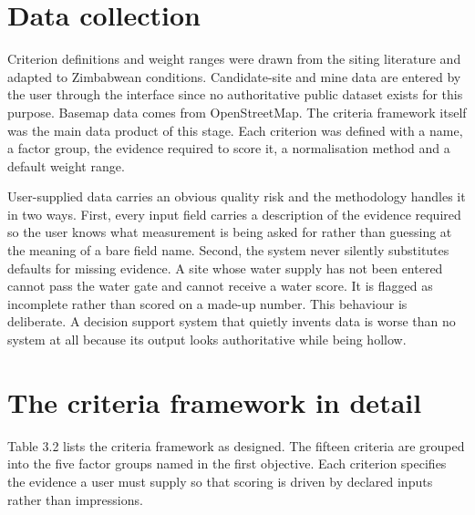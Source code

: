\documentclass[12pt,a4paper]{report}
\begin{document}
\section{Data collection}
Criterion definitions and weight ranges were drawn from the siting
literature and adapted to Zimbabwean conditions. Candidate-site and
mine data are entered by the user through the interface since no
authoritative public dataset exists for this purpose. Basemap data
comes from OpenStreetMap. The criteria framework itself was the main
data product of this stage. Each criterion was defined with a name, a
factor group, the evidence required to score it, a normalisation
method and a default weight range.

User-supplied data carries an obvious quality risk and the methodology
handles it in two ways. First, every input field carries a description
of the evidence required so the user knows what measurement is being
asked for rather than guessing at the meaning of a bare field name.
Second, the system never silently substitutes defaults for missing
evidence. A site whose water supply has not been entered cannot pass
the water gate and cannot receive a water score. It is flagged as
incomplete rather than scored on a made-up number. This behaviour is
deliberate. A decision support system that quietly invents data is
worse than no system at all because its output looks authoritative
while being hollow.

\section{The criteria framework in detail}
Table 3.2 lists the criteria framework as designed. The fifteen
criteria are grouped into the five factor groups named in the first
objective. Each criterion specifies the evidence a user must supply so
that scoring is driven by declared inputs rather than impressions.
\end{document}
